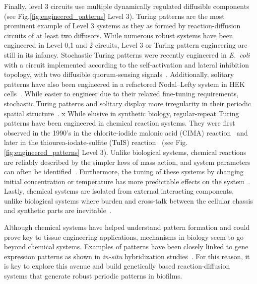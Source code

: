 Finally, level 3 circuits use multiple dynamically regulated diffusible components (see Fig.\ref{fig:engineered_patterns} Level 3).
Turing patterns are the most prominent example of Level 3 systems as they as formed by reaction-diffusion circuits of at least two diffusors.
While numerous robust systems have been engineered in Level 0,1 and 2 circuits, Level 3 or Turing pattern engineering are still in its infancy.
Stochastic Turing patterns were recently engineered in \textit{E.~coli} with a circuit implemented according to the self-activation and lateral inhibition topology, with two diffusible quorum-sensing signals~\parencite{Karig2018}.
Additionally, solitary patterns have also been engineered in a refactored Nodal–Lefty system in HEK cells~\parencite{Sekine2018}.
While easier to engineer due to their relaxed fine-tuning requirements, stochastic Turing patterns and solitary display more irregularity in their periodic spatial structure~\parencite{Butler2011, Karig2018,Sekine2018}.
x
While elusive in synthetic biology, regular-repeat Turing patterns have been engineered in chemical reaction systems.
They were first observed in the 1990's in the chlorite-iodide malonic acid (CIMA) reaction~\parencite{Castets, Lengyel1992} and later in the thiourea-iodate-sulfite (TuIS) reaction~\parencite{Horvath} (see Fig. \ref{fig:engineered_patterns} Level 3).
Unlike biological systems, chemical reactions are reliably described by the simpler laws of mass action, and system parameters can often be identified~\parencite{turanyi1994, kugler2009, Pusnik2019, Yeoh2019}.
Furthermore, the tuning of these systems by changing initial concentration or temperature has more predictable effects on the system~\parencite{Horvath, landeira2010, Asakura2011}.
Lastly, chemical systems are isolated from external interacting components, unlike biological systems where burden and cross-talk between the cellular chassis and synthetic parts are inevitable~\parencite{Ceroni2015, Nielsen2016,Butzin2018, Du2020}.


Although chemical systems have helped understand pattern formation and could prove key to tissue engineering applications, mechanisms in biology seem to go beyond chemical systems.
Examples of patterns have been closely linked to gene expression patterns as shown in \textit{in-situ} hybridization studies~\parencite{Jing2006}.
For this reason, it is key to explore this avenue and build genetically based reaction-diffusion systems that generate robust periodic patterns in biofilms.


